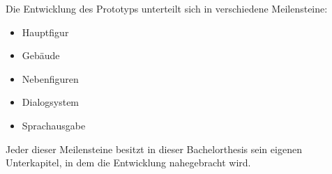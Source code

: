 Die Entwicklung des Prototyps unterteilt sich in verschiedene Meilensteine:
\begin{itemize}
	\item Hauptfigur
	\item Gebäude
	\item Nebenfiguren
	\item Dialogsystem
	\item Sprachausgabe
\end{itemize}
Jeder dieser Meilensteine besitzt in dieser Bachelorthesis sein eigenen Unterkapitel, in dem die Entwicklung nahegebracht wird.
